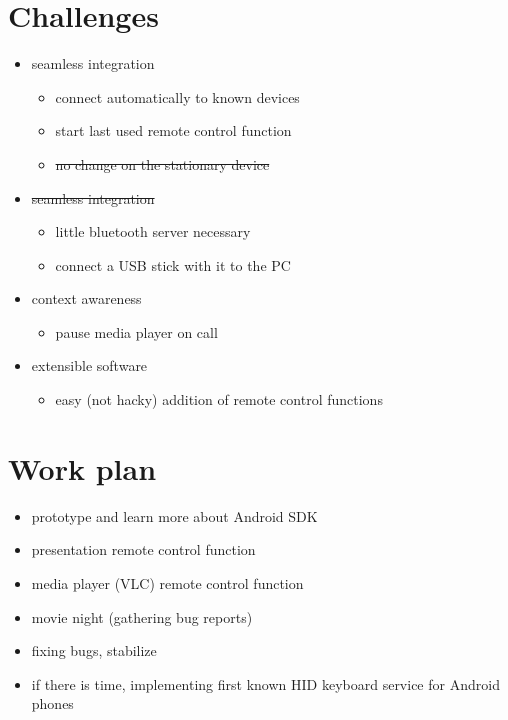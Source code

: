 \documentclass[ddc nogerman]{tudbeamer}
\begin{document}
\section{Challenges}
\begin{frame}
    \begin{itemize}
        \item seamless integration
        \begin{itemize}
            \item connect automatically to known devices
            \item start last used remote control function
            \item\sout{no change on the stationary device}
        \end{itemize}
        \item\sout{seamless integration}
        \begin{itemize}
            \item little bluetooth server necessary
            \item connect a USB stick with it to the PC
        \end{itemize}
        \item context awareness
        \begin{itemize}
            \item pause media player on call
        \end{itemize}
        \item extensible software
        \begin{itemize}
            \item easy (not hacky) addition of remote control functions
        \end{itemize}
    \end{itemize}
\end{frame}

\section{Work plan}
\begin{frame}
    \begin{itemize}
        \item prototype and learn more about Android SDK
        \\ \hfill
        \item presentation remote control function
        \item media player (VLC) remote control function
        \item movie night (gathering bug reports)
        \item fixing bugs, stabilize
        \\ \hfill
        \item if there is time, implementing first known HID keyboard service
            for Android phones
    \end{itemize}
\end{frame}
\end{document}
